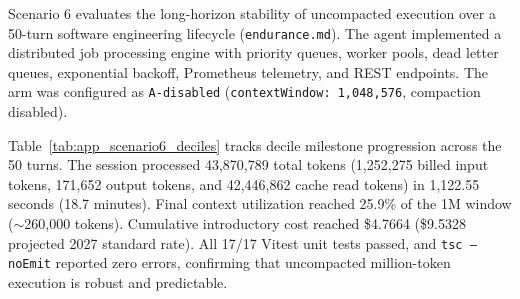 \documentclass[10pt,twocolumn,a4paper]{article}
\begin{document}
Scenario 6 evaluates the long-horizon stability of uncompacted execution over a 50-turn software engineering lifecycle (\texttt{endurance.md}). The agent implemented a distributed job processing engine with priority queues, worker pools, dead letter queues, exponential backoff, Prometheus telemetry, and REST endpoints. The arm was configured as \texttt{A-disabled} (\texttt{contextWindow: 1,048,576}, compaction disabled).

Table~\ref{tab:app_scenario6_deciles} tracks decile milestone progression across the 50 turns. The session processed 43,870,789 total tokens (1,252,275 billed input tokens, 171,652 output tokens, and 42,446,862 cache read tokens) in 1,122.55 seconds (18.7 minutes). Final context utilization reached 25.9\% of the 1M window ($\sim$260,000 tokens). Cumulative introductory cost reached \$4.7664 (\$9.5328 projected 2027 standard rate). All 17/17 Vitest unit tests passed, and \texttt{tsc --noEmit} reported zero errors, confirming that uncompacted million-token execution is robust and predictable.
\end{document}
